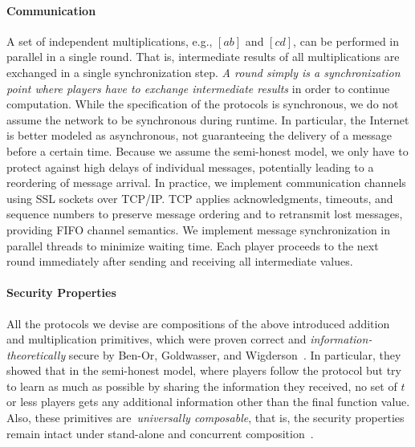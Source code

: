 \documentclass[letterpaper,11pt,onecolumn,titlepage]{article}
\begin{document}
\paragraph{Communication}
A set of independent multiplications, e.g., $[ab]$ and $[cd]$, can be performed
in parallel in a single round. That is, intermediate results of all multiplications
are exchanged in a single synchronization step. \emph{A round simply is a
synchronization point where players have to exchange intermediate results} in order
to continue computation. 
While the specification of the protocols is synchronous, we do not assume the network
to be synchronous during runtime. In particular, the Internet is better modeled as asynchronous, not guaranteeing
the delivery of a message before a certain time. Because we assume the semi-honest model, we only have to
protect against high delays of individual messages, potentially leading to a reordering of message arrival.
In practice, we implement communication channels using SSL sockets over TCP/IP. TCP applies
acknowledgments, timeouts, and sequence numbers to preserve message ordering and to retransmit
lost messages, providing FIFO channel semantics. We implement message synchronization in parallel threads to minimize waiting time.
Each player proceeds to the next round immediately after sending and receiving all intermediate values.





\paragraph{Security Properties} 
All the protocols we devise are compositions of the above introduced
addition and multiplication primitives, which were proven correct and
\emph{information-theoretically} secure by Ben-Or, Goldwasser, and
Wigderson~\cite{benor1988ctn}. In particular, they showed that in the
semi-honest model, where players follow the protocol but try to learn
as much as possible by sharing the information they received, no set
of $t$ or less players gets any additional information other than the
final function value.  Also, these primitives are~\emph{universally
composable}, that is, the security properties remain intact under
stand-alone and concurrent composition~\cite{canetti2001universally}.
\end{document}

